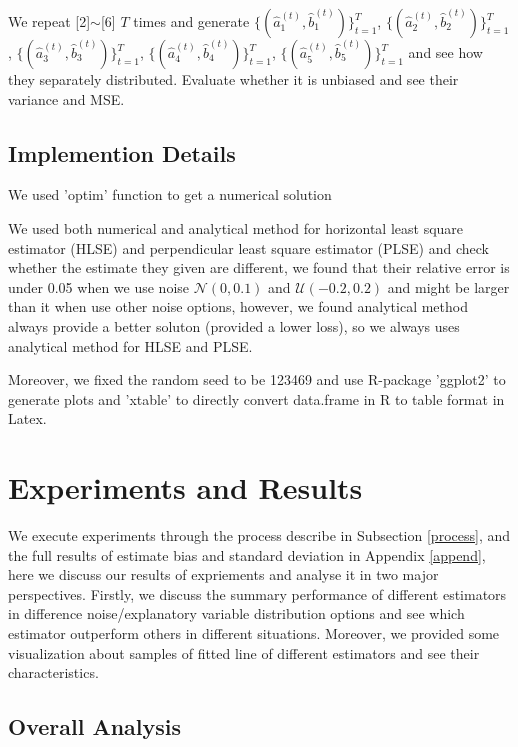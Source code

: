 \documentclass[twoside]{article}
\begin{document}
We repeat [2]$\sim$[6] $T$ times and generate $\{(\hat{a}_1^{(t)},\hat{b}_1^{(t)})\}_{t=1}^T$, $\{(\hat{a}_2^{(t)},\hat{b}_2^{(t)})\}_{t=1}^T$, $\{(\hat{a}_3^{(t)},\hat{b}_3^{(t)})\}_{t=1}^T$, $\{(\hat{a}_4^{(t)},\hat{b}_4^{(t)})\}_{t=1}^T$, $\{(\hat{a}_5^{(t)},\hat{b}_5^{(t)})\}_{t=1}^T$ and see how they separately distributed. Evaluate whether it is unbiased and see their variance and MSE. 

\subsection{Implemention Details}

We used 'optim' function to get a numerical solution 

We used both numerical and analytical method for horizontal least square estimator (HLSE) and perpendicular least square estimator (PLSE) and check whether the estimate they given are different, we found that their relative error is under 0.05 when we use noise $\mathcal{N}(0,0.1)$ and $\mathcal{U}(-0.2,0.2)$ and might be larger than it when use other noise options, however, we found analytical method always provide a better soluton (provided a lower loss), so we always uses analytical method for HLSE and PLSE.

Moreover, we fixed the random seed to be 123469 and use R-package 'ggplot2' to generate plots and 'xtable' to directly convert data.frame in R to table format in Latex.

\section{Experiments and Results}

We execute experiments through the process describe in Subsection \ref{process}, and the full results of estimate bias and standard deviation in Appendix \ref{append}, here we discuss our results of expriements and analyse it in two major perspectives. Firstly, we discuss the summary performance of different estimators in difference noise/explanatory variable distribution options and see which estimator outperform others in different situations. Moreover, we provided some visualization about samples of fitted line of different estimators and see their characteristics.

\subsection{Overall Analysis}
\end{document}
